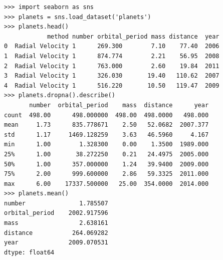 \documentclass[10pt,compress]{beamer} %
\begin{document}
\begin{frame}
	\scriptsize{
	\begin{columns}
 	   \column{\textwidth}
		\begin{exampleblock}{}
		\vspace{-0.2cm} 
			\begin{lstlisting}
>>> import seaborn as sns
>>> planets = sns.load_dataset('planets')
>>> planets.head()
            method number orbital_period mass distance  year
0  Radial Velocity 1      269.300        7.10    77.40  2006
1  Radial Velocity 1      874.774        2.21    56.95  2008
2  Radial Velocity 1      763.000        2.60    19.84  2011
3  Radial Velocity 1      326.030       19.40   110.62  2007
4  Radial Velocity 1      516.220       10.50   119.47  2009
>>> planets.dropna().describe()
       number  orbital_period    mass  distance      year
count  498.00      498.000000  498.00  498.0000   498.000
mean     1.73      835.778671    2.50   52.0682  2007.377
std      1.17     1469.128259    3.63   46.5960     4.167
min      1.00        1.328300    0.00    1.3500  1989.000
25%      1.00       38.272250    0.21   24.4975  2005.000
50%      1.00      357.000000    1.24   39.9400  2009.000
75%      2.00      999.600000    2.86   59.3325  2011.000
max      6.00    17337.500000   25.00  354.0000  2014.000
>>> planets.mean()
number               1.785507
orbital_period    2002.917596
mass                 2.638161
distance           264.069282
year              2009.070531
dtype: float64
			\end{lstlisting}
			\vspace{-0.2cm} 
		\end{exampleblock}
	\end{columns}
	}
\end{frame}
\end{document}
